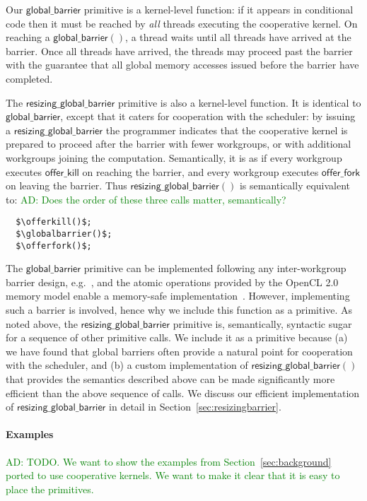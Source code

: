 \documentclass[nocopyrightspace]{sigplanconf-pldi16}
\newcommand{\ADComment}[1]{\textcolor{green}{AD: #1}}
\newcommand{\offerfork}{\mathsf{offer\_fork}}
\newcommand{\offerkill}{\mathsf{offer\_kill}}
\newcommand{\globalbarrier}{\mathsf{global\_barrier}}
\newcommand{\resizingglobalbarrier}{\mathsf{resizing\_global\_barrier}}
\begin{document}
Our $\globalbarrier$ primitive is a kernel-level function: if it appears in
conditional code then it must be reached by \emph{all} threads
executing the cooperative kernel.  On reaching a $\globalbarrier()$, a
thread waits until all threads have arrived at the barrier.  Once all
threads have arrived, the threads may proceed past the barrier with
the guarantee that all global memory accesses issued before the
barrier have completed.

The $\resizingglobalbarrier$ primitive is also a kernel-level
function.  It is identical to $\globalbarrier$, except that it caters
for cooperation with the scheduler: by issuing a
$\resizingglobalbarrier$ the programmer indicates that the cooperative
kernel is prepared to proceed after the barrier with fewer workgroups,
or with additional workgroups joining the computation.
Semantically, it is as if every workgroup executes $\offerkill$ on reaching the
barrier, and every workgroup executes $\offerfork$ on leaving the
barrier.  Thus $\resizingglobalbarrier()$ is semantically equivalent
to: \ADComment{Does the order of these three calls matter, semantically?}
%
\lstset{basicstyle=\tt}
\begin{lstlisting}
  $\offerkill()$;
  $\globalbarrier()$;
  $\offerfork()$;
\end{lstlisting}
\lstset{basicstyle=\scriptsize\tt}

The $\globalbarrier$ primitive can be implemented following any
inter-workgroup barrier design, e.g.~\cite{...}, and the atomic
operations provided by the OpenCL 2.0 memory model enable a
memory-safe implementation~\cite{...}.  However, implementing such a
barrier is involved, hence why we include this function as a
primitive.  As noted above, the $\resizingglobalbarrier$ primitive
is, semantically, syntactic sugar for a sequence of other primitive
calls.  We include it as a primitive because (a) we have found that
global barriers often provide a natural point for cooperation with the
scheduler, and (b) a custom implementation of
$\resizingglobalbarrier()$ that provides the semantics described above
can be made significantly more efficient than the above sequence of
calls.  We discuss our efficient implementation of
$\resizingglobalbarrier$ in detail in
Section~\ref{sec:resizingbarrier}.

\paragraph{Examples}

\ADComment{TODO.  We want to show the examples from Section~\ref{sec:background} ported to use cooperative kernels.  We want to make it clear that it is easy to place the primitives.}
\end{document}
